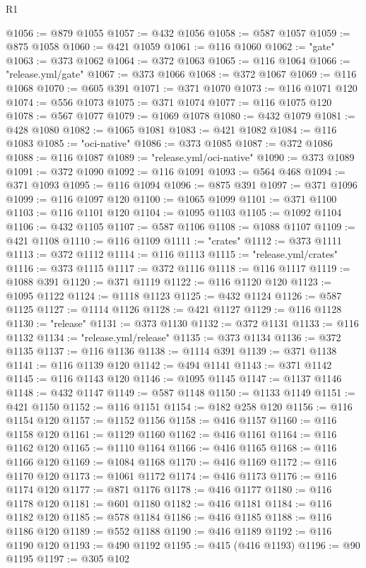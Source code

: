 \begin{lexlean}{R1}
\begin{coremodule}
@1056 := @879 @1055
@1057 := @432 @1056
@1058 := @587 @1057
@1059 := @875 @1058
@1060 := @421 @1059
@1061 := @116 @1060
@1062 := "gate"
@1063 := @373 @1062
@1064 := @372 @1063
@1065 := @116 @1064
@1066 := "release.yml/gate"
@1067 := @373 @1066
@1068 := @372 @1067
@1069 := @116 @1068
@1070 := @605 @391
@1071 := @371 @1070
@1073 := @116 @1071 @120
@1074 := @556 @1073
@1075 := @371 @1074
@1077 := @116 @1075 @120
@1078 := @567 @1077
@1079 := @1069 @1078
@1080 := @432 @1079
@1081 := @428 @1080
@1082 := @1065 @1081
@1083 := @421 @1082
@1084 := @116 @1083
@1085 := "oci-native"
@1086 := @373 @1085
@1087 := @372 @1086
@1088 := @116 @1087
@1089 := "release.yml/oci-native"
@1090 := @373 @1089
@1091 := @372 @1090
@1092 := @116 @1091
@1093 := @564 @468
@1094 := @371 @1093
@1095 := @116 @1094
@1096 := @875 @391
@1097 := @371 @1096
@1099 := @116 @1097 @120
@1100 := @1065 @1099
@1101 := @371 @1100
@1103 := @116 @1101 @120
@1104 := @1095 @1103
@1105 := @1092 @1104
@1106 := @432 @1105
@1107 := @587 @1106
@1108 := @1088 @1107
@1109 := @421 @1108
@1110 := @116 @1109
@1111 := "crates"
@1112 := @373 @1111
@1113 := @372 @1112
@1114 := @116 @1113
@1115 := "release.yml/crates"
@1116 := @373 @1115
@1117 := @372 @1116
@1118 := @116 @1117
@1119 := @1088 @391
@1120 := @371 @1119
@1122 := @116 @1120 @120
@1123 := @1095 @1122
@1124 := @1118 @1123
@1125 := @432 @1124
@1126 := @587 @1125
@1127 := @1114 @1126
@1128 := @421 @1127
@1129 := @116 @1128
@1130 := "release"
@1131 := @373 @1130
@1132 := @372 @1131
@1133 := @116 @1132
@1134 := "release.yml/release"
@1135 := @373 @1134
@1136 := @372 @1135
@1137 := @116 @1136
@1138 := @1114 @391
@1139 := @371 @1138
@1141 := @116 @1139 @120
@1142 := @494 @1141
@1143 := @371 @1142
@1145 := @116 @1143 @120
@1146 := @1095 @1145
@1147 := @1137 @1146
@1148 := @432 @1147
@1149 := @587 @1148
@1150 := @1133 @1149
@1151 := @421 @1150
@1152 := @116 @1151
@1154 := @182 @258 @120
@1156 := @116 @1154 @120
@1157 := @1152 @1156
@1158 := @416 @1157
@1160 := @116 @1158 @120
@1161 := @1129 @1160
@1162 := @416 @1161
@1164 := @116 @1162 @120
@1165 := @1110 @1164
@1166 := @416 @1165
@1168 := @116 @1166 @120
@1169 := @1084 @1168
@1170 := @416 @1169
@1172 := @116 @1170 @120
@1173 := @1061 @1172
@1174 := @416 @1173
@1176 := @116 @1174 @120
@1177 := @871 @1176
@1178 := @416 @1177
@1180 := @116 @1178 @120
@1181 := @601 @1180
@1182 := @416 @1181
@1184 := @116 @1182 @120
@1185 := @578 @1184
@1186 := @416 @1185
@1188 := @116 @1186 @120
@1189 := @552 @1188
@1190 := @416 @1189
@1192 := @116 @1190 @120
@1193 := @490 @1192
@1195 := @415 (@416 @1193)
@1196 := @90 @1195
@1197 := @305 @102

\end{coremodule}
\end{lexlean}
